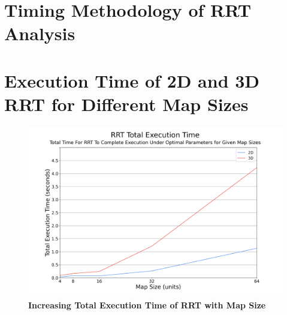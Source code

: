 \section{Timing Methodology of RRT Analysis}
\label{section:rrt_appendix_timing}
    

\section{Execution Time of 2D and 3D RRT for Different Map Sizes}
\label{section:rrt_time_taken}
\begin{figure}[H]
\begin{centering}
\includegraphics[width=0.65\linewidth]{chapters/chapter2/img/profiling/timing.png}
\caption[Increasing Total Execution Time of RRT with Map Size]{\textbf{Increasing Total Execution Time of RRT with Map Size}}
\label{fig:rrt_profiling_timing}
\end{centering}
\end{figure}
